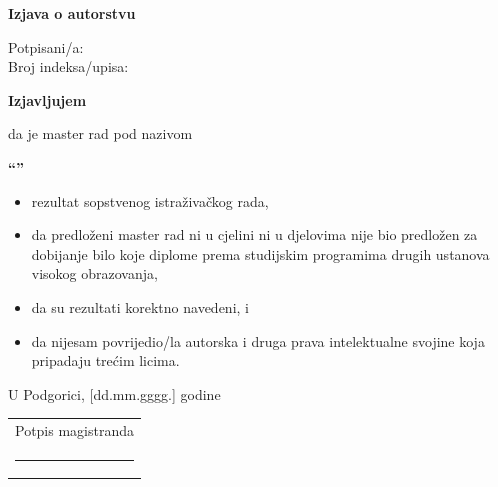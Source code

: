 \clearpage
\thispagestyle{empty}
\begingroup
\setlength{\parindent}{0pt}
\vspace*{2cm}
\begin{center}\bfseries Izjava o autorstvu\end{center}
\vspace{2em}

Potpisani/a: \RadAutor\\
Broj indeksa/upisa: \RadIndeks

\begin{center}\bfseries Izjavljujem\end{center}

da je master rad pod nazivom

\begin{center}\bfseries\enquote{\RadNaslov}\end{center}

\begin{itemize}[leftmargin=1.5cm]
  \item rezultat sopstvenog istraživačkog rada,
  \item da predloženi master rad ni u cjelini ni u djelovima nije bio predložen za dobijanje
        bilo koje diplome prema studijskim programima drugih ustanova visokog obrazovanja,
  \item da su rezultati korektno navedeni, i
  \item da nijesam povrijedio/la autorska i druga prava intelektualne svojine koja pripadaju
        trećim licima.
\end{itemize}

\vspace{3em}
U Podgorici, [dd.mm.gggg.] godine

\vspace{2em}
\hfill\begin{tabular}{c}
  Potpis magistranda\\[2.5em]
  \rule{5cm}{0.4pt}
\end{tabular}
\endgroup
